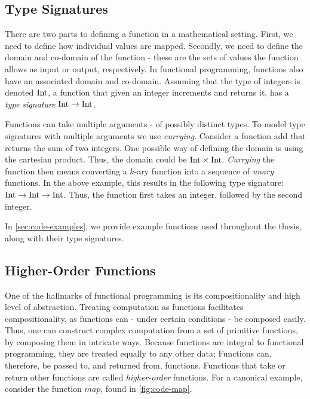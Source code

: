\subsection{Type Signatures}

There are two parts to defining a function in a mathematical setting. First, we need to define how individual values are mapped. Secondly, we need to define the domain and co-domain of the function - these are the sets of values the function allows as input or output, respectively. In functional programming, functions also have an associated domain and co-domain. Assuming that the type of integers is denoted \(\text{Int}\), a function that given an integer increments and returns it, has a \emph{type signature} \(\text{Int} \to \text{Int}\).  

Functions can take multiple arguments - of possibly distinct types. To model type signatures with multiple arguments we use \emph{currying}. Consider a function add that returns the sum of two integers. One possible way of defining the domain is using the cartesian product. Thus, the domain could be \(\text{Int} \times \text{Int}\). \emph{Currying} the function then means converting a \(k\)-ary function into a sequence of \emph{unary} functions. In the above example, this results in the following type signature: \(\text{Int} \to \text{Int} \to \text{Int}\). Thus, the function first takes an integer, followed by the second integer. 


In \cref{sec:code-examples}, we provide example functions used throughout the thesis, along with their type signatures.

\subsection{Higher-Order Functions}

One of the hallmarks of functional programming is its compositionality and high level of abstraction. Treating computation as functions facilitates compositionality, as functions can - under certain conditions - be composed easily. Thus, one can construct complex computation from a set of primitive functions, by composing them in intricate ways. Because functions are integral to functional programming, they are treated equally to any other data; Functions can, therefore, be passed to, and returned from, functions. Functions that take or return other functions are called \emph{higher-order} functions. For a canonical example, consider the function \(map\), found in \cref{fig:code-map}.

